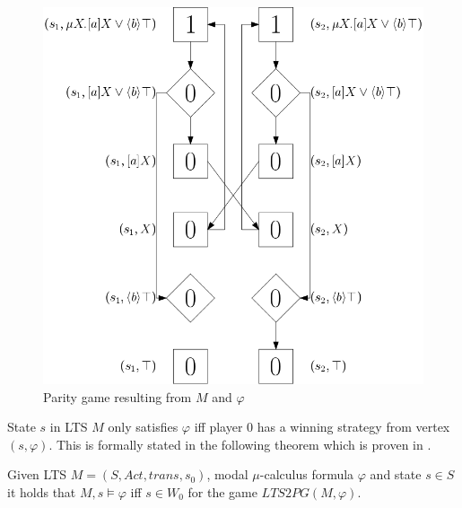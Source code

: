 \begin{figure}[h]
	\centering
	\includegraphics[scale=0.3]{Examples/ExamleVerification/PG}
	\caption[Parity game resulting from $M$ and $\varphi$]{Parity game resulting from $M$ and $\varphi$}
	\label{fig:exverpg}
\end{figure}

State $s$ in LTS $M$ only satisfies $\varphi$ iff player $0$ has a winning strategy from vertex $(s, \varphi)$. This is formally stated in the following theorem which is proven in \cite{Bradfield2018}.
\begin{theorem}
	\label{the_LTS_PG_REL}Given LTS $M = (S, Act, trans, s_0)$, modal $\mu$-calculus formula $\varphi$ and state $s \in S$ it holds that $M, s \models \varphi$ iff $s \in W_0$ for the game $LTS2PG(M, \varphi)$.
\end{theorem}

